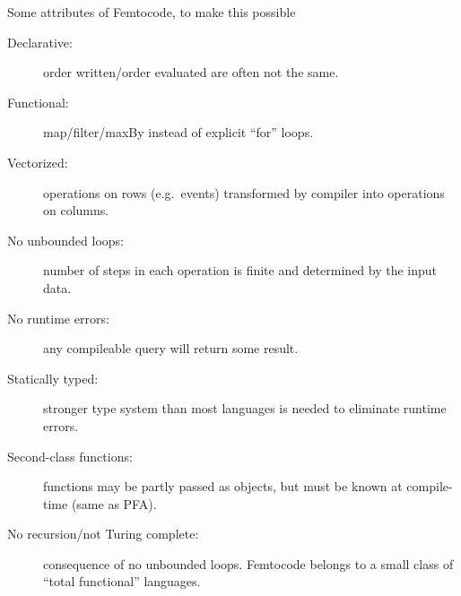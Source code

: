 \documentclass{beamer}
\begin{document}
\begin{frame}{Some attributes of Femtocode, to make this possible}
\vspace{0.25 cm}
\begin{description}
\item[Declarative:] order written/order evaluated are often not the same.
\item[Functional:] map/filter/maxBy instead of explicit ``for'' loops.
\item[Vectorized:] operations on rows (e.g.\ events) transformed by compiler into operations on columns.

\item[No unbounded loops:] number of steps in each operation is finite and determined by the input data.

\item[No runtime errors:] any compileable query will return some result.

\item[Statically typed:] stronger type system than most languages is needed to eliminate runtime errors.

\item[Second-class functions:] functions may be partly passed as objects, but must be known at compile-time (same as PFA).

\item[No recursion/not Turing complete:] consequence of no unbounded loops. Femtocode belongs to a small class of ``total functional'' languages.
\end{description}
\end{frame}
\end{document}

